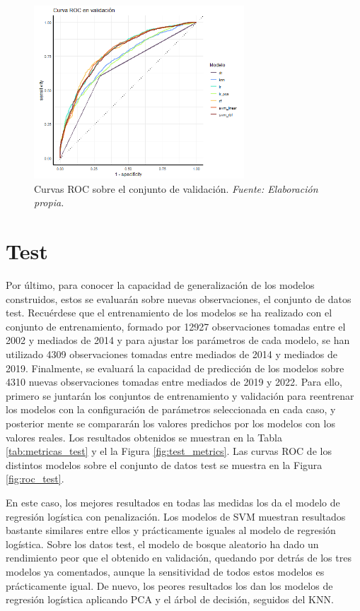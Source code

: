 \documentclass[12pt,a4paper,]{book}
\numberwithin{dummy}{section}
\theoremstyle{ocrenumbox}
\theoremstyle{blacknumex}
\theoremstyle{blacknumbox}
\theoremstyle{ocrenum}
\theoremstyle{ocrenum}
\begin{document}
\begin{figure}[h]
\centering
\includegraphics[width =0.7\textwidth]{graficos/roc_validation.png}
\caption[Curvas ROC sobre el conjunto de validación]{Curvas ROC sobre el conjunto de validación. \it Fuente: Elaboración propia.}
\label{fig:roc_validation}
\end{figure}

\hypertarget{test}{%
\section{Test}\label{test}}

Por último, para conocer la capacidad de generalización de los modelos
construidos, estos se evaluarán sobre nuevas observaciones, el conjunto
de datos test. Recuérdese que el entrenamiento de los modelos se ha
realizado con el conjunto de entrenamiento, formado por 12927
observaciones tomadas entre el 2002 y mediados de 2014 y para ajustar
los parámetros de cada modelo, se han utilizado 4309 observaciones
tomadas entre mediados de 2014 y mediados de 2019. Finalmente, se
evaluará la capacidad de predicción de los modelos sobre 4310 nuevas
observaciones tomadas entre mediados de 2019 y 2022. Para ello, primero
se juntarán los conjuntos de entrenamiento y validación para reentrenar
los modelos con la configuración de parámetros seleccionada en cada
caso, y posterior mente se compararán los valores predichos por los
modelos con los valores reales. Los resultados obtenidos se muestran en
la Tabla \ref{tab:metricas_test} y el la Figura \ref{fig:test_metrics}.
Las curvas ROC de los distintos modelos sobre el conjunto de datos test
se muestra en la Figura \ref{fig:roc_test}.

En este caso, los mejores resultados en todas las medidas los da el
modelo de regresión logística con penalización. Los modelos de SVM
muestran resultados bastante similares entre ellos y prácticamente
iguales al modelo de regresión logística. Sobre los datos test, el
modelo de bosque aleatorio ha dado un rendimiento peor que el obtenido
en validación, quedando por detrás de los tres modelos ya comentados,
aunque la sensitividad de todos estos modelos es prácticamente igual. De
nuevo, los peores resultados los dan los modelos de regresión logística
aplicando PCA y el árbol de decisión, seguidos del KNN.
\end{document}

